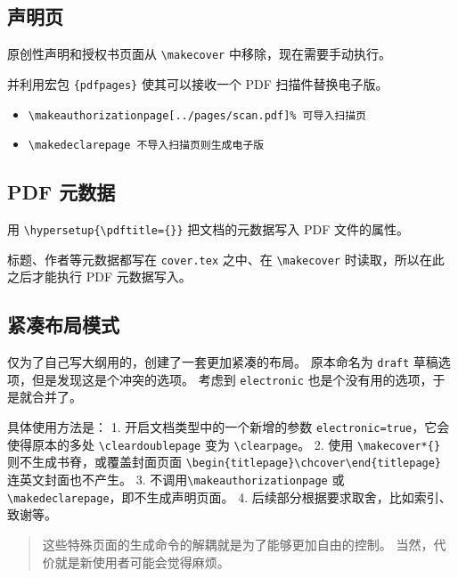 \documentclass[../Main/thesis.tex]{subfiles}
\begin{document}
\subsection{声明页}

原创性声明和授权书页面从 \texttt{\textbackslash{}makecover}
中移除，现在需要手动执行。

并利用宏包 \texttt{\{pdfpages\}} 使其可以接收一个 PDF 扫描件替换电子版。

\begin{itemize}
\item
  \texttt{\textbackslash{}makeauthorizationpage[../pages/scan.pdf]\%\ 可导入扫描页}
\item
  \texttt{\textbackslash{}makedeclarepage\ 不导入扫描页则生成电子版}
\end{itemize}

\subsection{PDF 元数据}

用 \texttt{\textbackslash{}hypersetup\{\textbackslash{}pdftitle=\{\}\}}
把文档的元数据写入 PDF 文件的属性。

标题、作者等元数据都写在 \texttt{cover.tex} 之中、在
\texttt{\textbackslash{}makecover} 时读取，所以在此之后才能执行 PDF
元数据写入。

\subsection{紧凑布局模式}

仅为了自己写大纲用的，创建了一套更加紧凑的布局。 原本命名为
\texttt{draft} 草稿选项，但是发现这是个冲突的选项。 考虑到
\texttt{electronic} 也是个没有用的选项，于是就合并了。

具体使用方法是： 1. 开启文档类型中的一个新增的参数
\texttt{electronic=true}，它会使得原本的多处
\texttt{\textbackslash{}cleardoublepage} 变为
\texttt{\textbackslash{}clearpage}。 2. 使用
\texttt{\textbackslash{}makecover*\{\}} 则不生成书脊，或覆盖封面页面
\texttt{\textbackslash{}begin\{titlepage\}\textbackslash{}chcover\textbackslash{}end\{titlepage\}}
连英文封面也不产生。 3.
不调用\texttt{\textbackslash{}makeauthorizationpage} 或
\texttt{\textbackslash{}makedeclarepage}，即不生成声明页面。 4.
后续部分根据要求取舍，比如索引、致谢等。

\begin{quote}
这些特殊页面的生成命令的解耦就是为了能够更加自由的控制。
当然，代价就是新使用者可能会觉得麻烦。
\end{quote}
\end{document}
